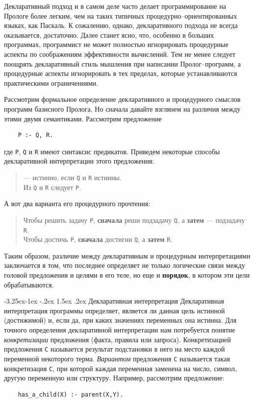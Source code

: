\documentclass[12pt, openany, twoside]{book} %
\makeatletter
\renewcommand\subsection{\@startsection{subsection}{2}{\z@}%
                                     {-3.25ex\@plus -1ex \@minus -.2ex}%
                                     {1.5ex \@plus .2ex}%
                                     {\normalfont\normalsize\bfseries}}
\makeatother
\begin{document}
Декларативный подход и в самом деле часто делает программирование на Прологе более легким, чем на таких типичных процедурно--ориентированных языках, как Паскаль. К сожалению, однако, декларативного подхода не всегда оказывается, достаточно. Далее станет ясно, что, особенно в больших программах, программист не может полностью игнорировать процедурные аспекты по соображениям эффективности вычислений. Тем не менее следует поощрять декларативный стиль мышления при написании Пролог--программ, а процедурные аспекты игнорировать в тех пределах, которые устанавливаются практическими ограничениями.

Рассмотрим формальное определение декларативного и процедурного смыслов программ базисного Пролога. Но сначала давайте взглянем на различия между этими двумя семантиками. Рассмотрим предложение
{\tt\begin{verbatim}
    Р :- Q, R.
\end{verbatim}}
\noindent где {\tt Р}, {\tt Q} и {\tt R} имеют синтаксис предикатов. Приведем некоторые способы декларативной интерпретации этого предложения:
\begin{quote}
 --- истинно, если {\tt Q} и {\tt R} истинны. \\
Из {\tt Q} и {\tt R} следует {\tt Р}.
\end{quote}

\noindent А вот два варианта его процедурного прочтения:

\begin{quote}
\noindent Чтобы решить задачу {\tt Р}, \textbf{сначала} реши подзадачу {\tt Q}, а {\bf затем} --- подзадачу {\tt R}. \\
Чтобы достичь {\tt Р}, \textbf{сначала} достигни {\tt Q},
а \textbf{затем} {\tt R}.
\end{quote}

Таким образом, различие между декларативным и процедурным интерпретациями заключается в том, что последнее определяет не только логические связи между головой предложения и целями в его теле, но еще и {\bf порядок}, в котором эти цели обрабатываются.

\subsection{Декларативная интерпретация}
Декларативная интерпретация программы определяет, является ли данная цель истинной (достижимой) и, если да, при каких значениях переменных она истинна. Для точного определения декларативной интерпретации нам потребуется понятие \emph{конкретизации} предложения (факта, правила или запроса). Конкретизацией предложения {\tt С} называется результат подстановки в него на место каждой переменной некоторого терма. \emph{Вариантом} предложения {\tt С} называется такая конкретизация {\tt С}, при которой каждая переменная заменена на число, символ, другую переменную или структуру. Например, рассмотрим предложение:
{\tt\begin{verbatim}
    has_a_child(X) :- parent(X,Y).
\end{verbatim}}
\end{document}
